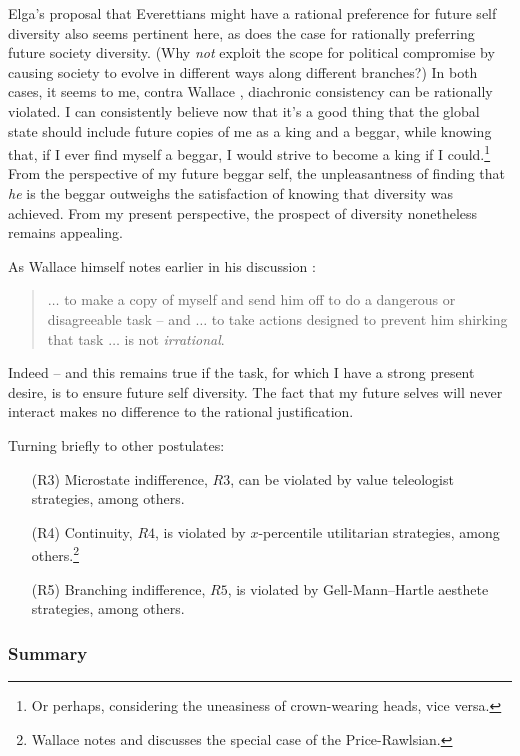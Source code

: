 \documentclass[aps,
pra,epsfig,12pt,nofootinbib]{revtex4}
\begin{document}
Elga's proposal that Everettians might have a rational preference for 
future self diversity \cite{wallacevoltwoelga} also seems pertinent
here, as does the case for rationally preferring future 
society diversity.  (Why {\it not} 
exploit the scope for political compromise by causing   
society to evolve in different ways along different branches?) 
In both cases, it seems to me, 
contra Wallace \cite{wallacevoltwoelga}, diachronic 
consistency can be rationally violated.  
I can consistently believe now that it's a good thing that the 
global state should include future copies of me as a king and a beggar, 
while knowing that, if I ever find myself a beggar, I would strive to become
a king if I could.\footnote{Or perhaps, considering the uneasiness of 
crown-wearing heads, vice versa.}  From the perspective
of my future beggar self, the unpleasantness
of finding that {\it he} is the beggar outweighs the satisfaction of knowing
that diversity was achieved.   From my present perspective, the 
prospect of diversity nonetheless remains appealing. 

As Wallace himself notes earlier in his discussion \cite{wallacetwodictates}: 
\begin{quotation}
$\ldots$ to make a copy of myself and send him off to do a dangerous or 
disagreeable task -- and $\ldots$ to take actions designed to
prevent him shirking that task $\ldots$ is not {\it irrational}.
\end{quotation}
Indeed -- and this remains true if the task, for which I have a strong present
desire, is to ensure future self diversity.  The fact that my future 
selves will never interact makes no difference to the rational justification. 

Turning briefly to other postulates:
\begin{itemize}
\item[(R3)] Microstate indifference, $R3$, can be violated by value
teleologist strategies, among others.   
\item[(R4)] Continuity, $R4$, is 
violated by $x$-percentile utilitarian strategies,
among others.\footnote{Wallace \cite{wallacevoltwo} notes and discusses 
the special case of the Price-Rawlsian.}
\item[(R5)] Branching indifference, $R5$,
is violated by Gell-Mann--Hartle aesthete strategies, among others.  
\end{itemize}

\subsubsection{Summary}
\end{document}
